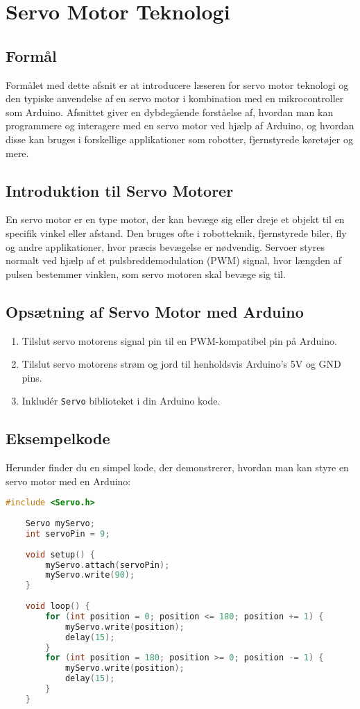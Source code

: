 \section{Servo Motor Teknologi}

\subsection*{Formål}
Formålet med dette afsnit er at introducere læseren for servo motor teknologi og den typiske anvendelse af en servo motor i kombination med en mikrocontroller som Arduino. Afsnittet giver en dybdegående forståelse af, hvordan man kan programmere og interagere med en servo motor ved hjælp af Arduino, og hvordan disse kan bruges i forskellige applikationer som robotter, fjernstyrede køretøjer og mere.

\subsection*{Introduktion til Servo Motorer}
En servo motor er en type motor, der kan bevæge sig eller dreje et objekt til en specifik vinkel eller afstand. Den bruges ofte i robotteknik, fjernstyrede biler, fly og andre applikationer, hvor præcis bevægelse er nødvendig. Servoer styres normalt ved hjælp af et pulsbreddemodulation (PWM) signal, hvor længden af pulsen bestemmer vinklen, som servo motoren skal bevæge sig til.

\subsection*{Opsætning af Servo Motor med Arduino}
\begin{enumerate}
	\item Tilslut servo motorens signal pin til en PWM-kompatibel pin på Arduino.
	\item Tilslut servo motorens strøm og jord til henholdsvis Arduino's 5V og GND pins.
	\item Inkludér \texttt{Servo} biblioteket i din Arduino kode.
\end{enumerate}

\subsection*{Eksempelkode}
Herunder finder du en simpel kode, der demonstrerer, hvordan man kan styre en servo motor med en Arduino:

\begin{lstlisting}[language=C++, caption=Arduino Code for Controlling a Servo Motor]
	#include <Servo.h>
	
	Servo myServo;  
	int servoPin = 9; 
	
	void setup() {
		myServo.attach(servoPin);  
		myServo.write(90);  
	}
	
	void loop() {
		for (int position = 0; position <= 180; position += 1) {
			myServo.write(position);
			delay(15);
		}
		for (int position = 180; position >= 0; position -= 1) {
			myServo.write(position);
			delay(15);  
		}
	}
\end{lstlisting}


